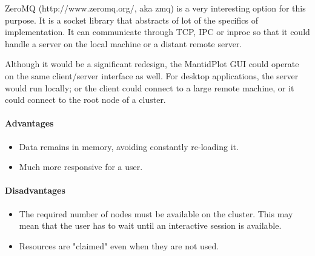 ZeroMQ (http://www.zeromq.org/, aka zmq) is a very interesting option for this purpose. It is a socket library that abstracts of lot of the specifics of implementation. It can communicate through TCP, IPC or inproc so that it could handle a server on the local machine or a distant remote server.

Although it would be a significant redesign, the MantidPlot GUI could operate on the same client/server interface as well. For desktop applications, the server would run locally; or the client could connect to a large remote machine, or it could connect to the root node of a cluster.

\paragraph{Advantages}

\begin{itemize}
\item Data remains in memory, avoiding constantly re-loading it.
\item Much more responsive for a user.
\end{itemize}

\paragraph{Disadvantages}

\begin{itemize}
\item The required number of nodes must be available on the cluster. This may mean that the user has to wait until an interactive session is available.
\item Resources are "claimed" even when they are not used. 
\end{itemize}
